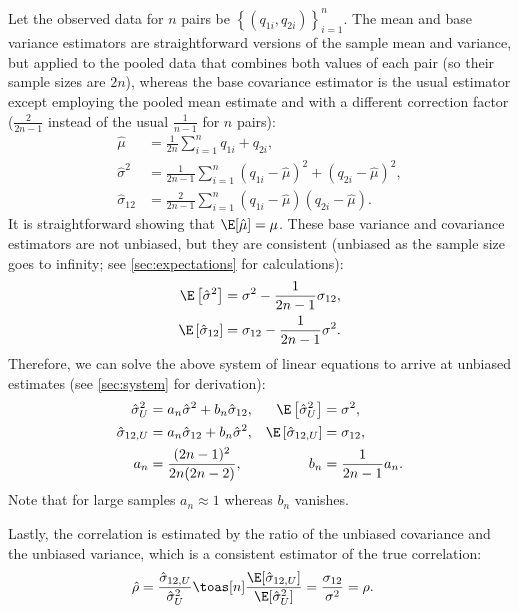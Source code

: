 \documentclass[11pt]{article}
\begin{document}
Let the observed data for $n$ pairs be $\left\{ (q_{1i}, q_{2i}) \right\}_{i=1}^n$.
The mean and base variance estimators are straightforward versions of the sample mean and variance, but applied to the pooled data that combines both values of each pair (so their sample sizes are $2n$), whereas the base covariance estimator is the usual estimator except employing the pooled mean estimate and with a different correction factor ($\frac{2}{2n - 1}$ instead of the usual $\frac{1}{n - 1}$ for $n$ pairs):
\begin{align*}
  \hat{\mu}
  &=
    \frac{1}{2n} \sum_{i=1}^n q_{1i} + q_{2i}
    , \\
  \hat{\sigma}^2
  &=
    \frac{1}{2n - 1} \sum_{i=1}^n ( q_{1i} - \hat{\mu} )^2 + ( q_{2i} - \hat{\mu} )^2
    , \\
  \hat{\sigma}_{12}
  &=
    \frac{2}{2n - 1} \sum_{i=1}^n ( q_{1i} - \hat{\mu} )( q_{2i} - \hat{\mu} )
    .
\end{align*}
It is straightforward showing that $\E[ \hat{\mu} ] = \mu$.
These base variance and covariance estimators are not unbiased, but they are consistent (unbiased as the sample size goes to infinity; see \cref{sec:expectations} for calculations):
\begin{align*}
  \E \left[ \hat{\sigma}^2 \right]
  &=
    \sigma^2 - \frac{1}{2n - 1} \sigma_{12}
    , \\
  \E \left[ \hat{\sigma}_{12} \right]
  &=
    \sigma_{12} - \frac{1}{2n-1} \sigma^2
.
\end{align*}
Therefore, we can solve the above system of linear equations to arrive at unbiased estimates (see \cref{sec:system} for derivation):
\begin{align*}
  \hat{\sigma}^2_U
  &=
    a_n \hat{\sigma}^2 + b_n \hat{\sigma}_{12}
    ,
  &\E \left[ \hat{\sigma}^2_U \right]
  &= \sigma^2
    , \\
  \hat{\sigma}_{12,U}
  &=
    a_n \hat{\sigma}_{12} + b_n \hat{\sigma}^2
    ,
  &\E \left[ \hat{\sigma}_{12,U} \right]
  &= \sigma_{12}
    , \\
  a_n
  &=
    \frac{(2n-1)^2}{2n(2n-2)}
    ,
  &b_n
  &=
    \frac{1}{2n-1} a_n
    .
\end{align*}
Note that for large samples $a_n \approx 1$ whereas $b_n$ vanishes.

Lastly, the correlation is estimated by the ratio of the unbiased covariance and the unbiased variance, which is a consistent estimator of the true correlation:
\begin{align*}
  \hat{\rho}
  &=
    \frac{ \hat{\sigma}_{12,U} }{ \hat{\sigma}^2_U }
    \toas[n]
    \frac{ \E[ \hat{\sigma}_{12,U} ] }{ \E [ \hat{\sigma}^2_U ] }
    =
    \frac{ \sigma_{12} }{ \sigma^2 }
    =
    \rho
    .    
\end{align*}
\end{document}
